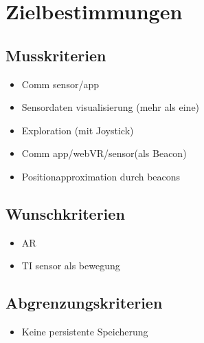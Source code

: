 \section{Zielbestimmungen}


\textbf{}

\subsection{Musskriterien}

\begin{itemize}
  \item Comm sensor/app
  \item Sensordaten visualisierung (mehr als eine)
  \item Exploration (mit Joystick)
  \item Comm app/webVR/sensor(als Beacon)
  \item Positionapproximation durch beacons
\end{itemize}

\subsection{Wunschkriterien}

\begin{itemize}
  \item AR
  \item TI sensor als bewegung
\end{itemize}

\subsection{Abgrenzungskriterien}

\begin{itemize}
  \item Keine persistente Speicherung
\end{itemize}
